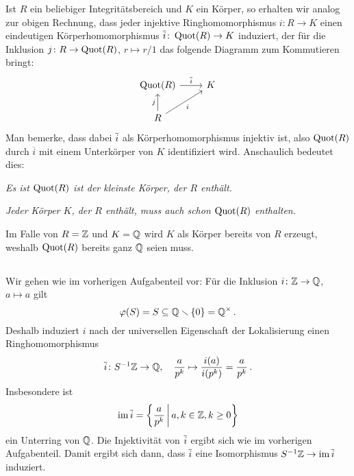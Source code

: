 \begin{remark}
  Ist $R$ ein beliebiger Integritätsbereich und $K$ ein Körper, so erhalten wir analog zur obigen Rechnung, dass jeder injektive Ringhomomorphismus $i \colon R \to K$ einen eindeutigen Körperhomomorphismus $\overline{i} \colon \operatorname{Quot}(R) \to K$ induziert, der für die Inklusion $j \colon R \to \operatorname{Quot}(R)$, $r \mapsto r/1$ das folgende Diagramm zum Kommutieren bringt:
  \[
    \begin{tikzcd}
        \Quot{R}
        \arrow{r}{\induced{i}}
      & K
      \\
        R
        \arrow{u}{j}
        \arrow[swap]{ur}{i}
      & {}
    \end{tikzcd}
  \]
  Man bemerke, dass dabei $\overline{i}$ als Körperhomomorphismus injektiv ist, also $\operatorname{Quot}(R)$ durch $\overline{i}$ mit einem Unterkörper von $K$ identifiziert wird.
  Anschaulich bedeutet dies:
  \begin{center}
    \emph{Es ist $\operatorname{Quot}(R)$ ist der kleinste Körper, der $R$ enthält.}
  \end{center}
  \begin{center}
    \emph{Jeder Körper $K$, der $R$ enthält, muss auch schon $\operatorname{Quot}(R)$ enthalten.}
  \end{center}
  Im Falle von $R = \mathbb{Z}$ und $K = \mathbb{Q}$ wird $K$ als Körper bereits von $R$ erzeugt, weshalb $\operatorname{Quot}(R)$ bereits ganz $\mathbb{Q}$ seien muss.
\end{remark}





\subsection{}

Wir gehen wie im vorherigen Aufgabenteil vor:
Für die Inklusion $i \colon \mathbb{Z} \to \mathbb{Q}$, $a \mapsto a$ gilt
\[
            \varphi(S)
  =         S
  \subseteq \mathbb{Q} \smallsetminus \{0\}
  =         \mathbb{Q}^\times \,.
\]
Deshalb induziert $i$ nach der universellen Eigenschaft der Lokalisierung einen Ringhomomorphismus
\[
          \overline{i}
  \colon  S^{-1} \mathbb{Z}
  \to     \mathbb{Q},
  \quad   \frac{a}{p^k}
  \mapsto \frac{i(a)}{i(p^k)}
  =       \frac{a}{p^k} \,.
\]
Insbesondere ist
\[
    \im \induced{i}
  = \left\{
      \frac{a}{p^k}
    \suchthat*
      a, k \in \Integer,
      k \geq 0
    \right\}
\]
ein Unterring von $\mathbb{Q}$.
Die Injektivität von $\overline{i}$ ergibt sich wie im vorherigen Aufgabenteil.
Damit ergibt sich dann, dass $\overline{i}$ eine Isomorphismus $S^{-1} \mathbb{Z} \to \operatorname{im} \overline{i}$ induziert.




